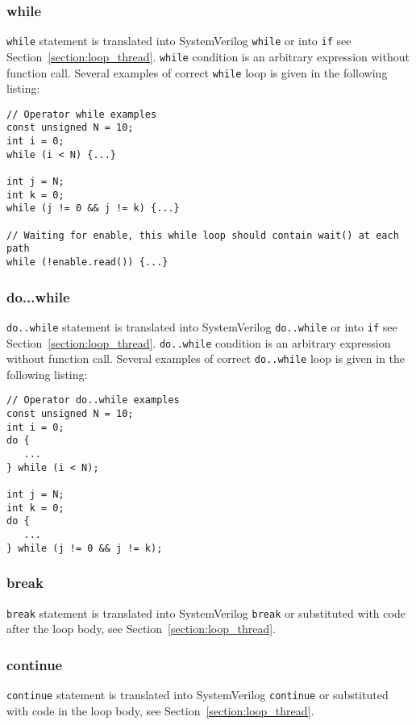 \subsubsection{while}

{\tt while} statement is translated into SystemVerilog {\tt while} or into {\tt if} see Section~\ref{section:loop_thread}.
{\tt while} condition is an arbitrary expression without function call.
Several examples of correct {\tt while} loop is given in the following listing:
%
\begin{lstlisting}[style=mycpp]
// Operator while examples
const unsigned N = 10;
int i = 0;
while (i < N) {...}

int j = N;
int k = 0;
while (j != 0 && j != k) {...}

// Waiting for enable, this while loop should contain wait() at each path
while (!enable.read()) {...}
\end{lstlisting}

\subsubsection{do...while}

{\tt do..while} statement is translated into SystemVerilog {\tt do..while} or into {\tt if} see Section~\ref{section:loop_thread}. 
{\tt do..while} condition is an arbitrary expression without function call.
Several examples of correct {\tt do..while} loop is given in the following listing:
%
\begin{lstlisting}[style=mycpp]
// Operator do..while examples
const unsigned N = 10;
int i = 0;
do {
   ...
} while (i < N);

int j = N;
int k = 0;
do {
   ...
} while (j != 0 && j != k);
\end{lstlisting}

\subsubsection{break}

{\tt break} statement is translated into SystemVerilog {\tt break} or substituted  with code after the loop body, see Section~\ref{section:loop_thread}. 

\subsubsection{continue}

{\tt continue} statement is translated into SystemVerilog {\tt continue} or substituted with code in the loop body, see Section~\ref{section:loop_thread}. 

